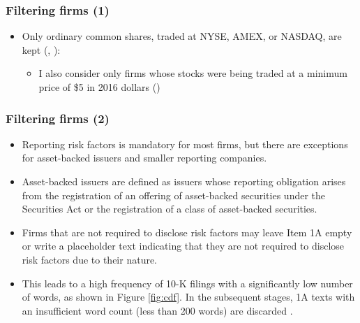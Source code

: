 \documentclass{beamer}
\begin{document}
\begin{frame}
\frametitle{Filtering firms (1)}
\begin{itemize}
\item Only ordinary common shares, traded at NYSE, AMEX, or NASDAQ, are kept (\cite{Stambaugh2016-eb}, \cite{Golubov2019-ku}):
\begin{itemize}
  \item I also consider only firms whose stocks were being traded at a minimum price of \$5 in 2016 dollars (\cite{Stambaugh2016-eb})
\end{itemize}
\end{itemize}
\end{frame}



\begin{frame}
\frametitle{Filtering firms (2)}
\begin{itemize}
\item Reporting risk factors is mandatory for most firms, but there are exceptions for asset-backed issuers and smaller reporting companies.
\item Asset-backed issuers are defined as issuers whose reporting obligation arises from the registration of an offering of asset-backed securities under the Securities Act or the registration of a class of asset-backed securities.
\item Firms that are not required to disclose risk factors may leave Item 1A empty or write a placeholder text indicating that they are not required to disclose risk factors due to their nature.
\item This leads to a high frequency of 10-K filings with a significantly low number of words, as shown in Figure \ref{fig:cdf}. In the subsequent stages, 1A texts with an insufficient word count (less than 200 words) are discarded \hyperlink{min_words}{}.

\end{itemize}
\end{frame}
\end{document}
